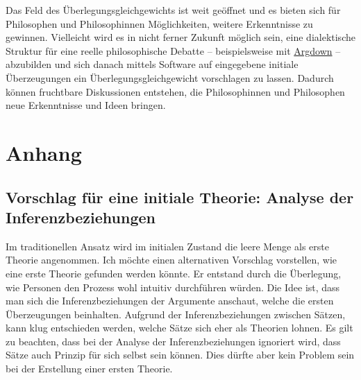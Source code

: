 \documentclass{article}
\begin{document}
Das Feld des Überlegungsgleichgewichts ist weit geöffnet und es bieten sich für Philosophen und Philosophinnen Möglichkeiten, weitere Erkenntnisse zu gewinnen. Vielleicht wird es in nicht ferner Zukunft möglich sein, eine dialektische Struktur für eine reelle philosophische Debatte -- beispielsweise mit \href{https://argdown.org/}{Argdown} -- abzubilden und sich danach mittels Software auf eingegebene initiale Überzeugungen ein Überlegungsgleichgewicht vorschlagen zu lassen. Dadurch können fruchtbare Diskussionen entstehen, die Philosophinnen und Philosophen neue Erkenntnisse und Ideen bringen.


\newpage
\printbibliography

\newpage 
\listoffigures

\newpage

\section{Anhang}
\subsection{ Vorschlag für eine initiale Theorie: Analyse der Inferenzbeziehungen} \label{better-first-theory}
Im traditionellen Ansatz wird im initialen Zustand die leere Menge als erste Theorie angenommen. Ich möchte einen alternativen Vorschlag vorstellen, wie eine erste Theorie gefunden werden könnte. Er entstand durch die Überlegung, wie Personen den Prozess wohl intuitiv durchführen würden. Die Idee ist, dass man sich die Inferenzbeziehungen der Argumente anschaut, welche die ersten Überzeugungen beinhalten. Aufgrund der Inferenzbeziehungen zwischen Sätzen, kann klug entschieden werden, welche Sätze sich eher als Theorien lohnen. Es gilt zu beachten, dass bei der Analyse der Inferenzbeziehungen ignoriert wird, dass Sätze auch Prinzip für sich selbst sein können. Dies dürfte aber kein Problem sein bei der Erstellung einer ersten Theorie.
\end{document}
